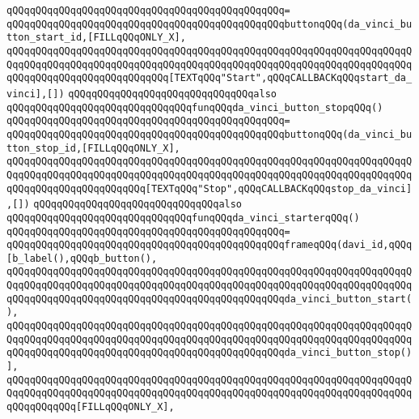 \verb|qQQqqQQqqQQqqQQqqQQqqQQqqQQqqQQqqQQqqQQqqQQqqQQq=|\newline
\verb|qQQqqQQqqQQqqQQqqQQqqQQqqQQqqQQqqQQqqQQqqQQqqQQqbuttonqQQq(da_vinci_button_start_id,[FILLqQQqONLY_X],|\newline
\verb|qQQqqQQqqQQqqQQqqQQqqQQqqQQqqQQqqQQqqQQqqQQqqQQqqQQqqQQqqQQqqQQqqQQqqQQqqQQqqQQqqQQqqQQqqQQqqQQqqQQqqQQqqQQqqQQqqQQqqQQqqQQqqQQqqQQqqQQqqQQqqQQqqQQqqQQqqQQqqQQqqQQqqQQq[TEXTqQQq"Start",qQQqCALLBACKqQQqstart_da_vinci],[])|\newline
\newline
\verb|qQQqqQQqqQQqqQQqqQQqqQQqqQQqqQQqalso|\newline
\verb|qQQqqQQqqQQqqQQqqQQqqQQqqQQqqQQqfunqQQqda_vinci_button_stopqQQq()|\newline
\verb|qQQqqQQqqQQqqQQqqQQqqQQqqQQqqQQqqQQqqQQqqQQqqQQq=|\newline
\verb|qQQqqQQqqQQqqQQqqQQqqQQqqQQqqQQqqQQqqQQqqQQqqQQqbuttonqQQq(da_vinci_button_stop_id,[FILLqQQqONLY_X],|\newline
\verb|qQQqqQQqqQQqqQQqqQQqqQQqqQQqqQQqqQQqqQQqqQQqqQQqqQQqqQQqqQQqqQQqqQQqqQQqqQQqqQQqqQQqqQQqqQQqqQQqqQQqqQQqqQQqqQQqqQQqqQQqqQQqqQQqqQQqqQQqqQQqqQQqqQQqqQQqqQQqqQQqqQQq[TEXTqQQq"Stop",qQQqCALLBACKqQQqstop_da_vinci],[])|\newline
\newline
\verb|qQQqqQQqqQQqqQQqqQQqqQQqqQQqqQQqalso|\newline
\verb|qQQqqQQqqQQqqQQqqQQqqQQqqQQqqQQqfunqQQqda_vinci_starterqQQq()|\newline
\verb|qQQqqQQqqQQqqQQqqQQqqQQqqQQqqQQqqQQqqQQqqQQqqQQq=|\newline
\verb|qQQqqQQqqQQqqQQqqQQqqQQqqQQqqQQqqQQqqQQqqQQqqQQqframeqQQq(davi_id,qQQq[b_label(),qQQqb_button(),|\newline
\verb|qQQqqQQqqQQqqQQqqQQqqQQqqQQqqQQqqQQqqQQqqQQqqQQqqQQqqQQqqQQqqQQqqQQqqQQqqQQqqQQqqQQqqQQqqQQqqQQqqQQqqQQqqQQqqQQqqQQqqQQqqQQqqQQqqQQqqQQqqQQqqQQqqQQqqQQqqQQqqQQqqQQqqQQqqQQqqQQqqQQqqQQqqQQqda_vinci_button_start(),|\newline
\verb|qQQqqQQqqQQqqQQqqQQqqQQqqQQqqQQqqQQqqQQqqQQqqQQqqQQqqQQqqQQqqQQqqQQqqQQqqQQqqQQqqQQqqQQqqQQqqQQqqQQqqQQqqQQqqQQqqQQqqQQqqQQqqQQqqQQqqQQqqQQqqQQqqQQqqQQqqQQqqQQqqQQqqQQqqQQqqQQqqQQqqQQqqQQqda_vinci_button_stop()],|\newline
\verb|qQQqqQQqqQQqqQQqqQQqqQQqqQQqqQQqqQQqqQQqqQQqqQQqqQQqqQQqqQQqqQQqqQQqqQQqqQQqqQQqqQQqqQQqqQQqqQQqqQQqqQQqqQQqqQQqqQQqqQQqqQQqqQQqqQQqqQQqqQQqqQQqqQQqqQQq[FILLqQQqONLY_X],|\newline

